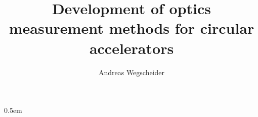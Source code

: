 \documentclass[titlepage]{scrbook}
\author{Andreas Wegscheider}
\title{Development of optics measurement methods for circular accelerators}
\begin{document}
%




\parindent0pt
\parskip0.5em

%







%




    
\end{document}
